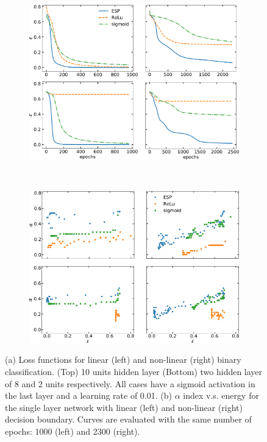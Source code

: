 \documentclass[5p]{elsarticle}
\begin{document}
\begin{figure}[t!]
\centering
	\begin{subfigure}[b]{0.48 \textwidth}
	\includegraphics[width = \textwidth]{costs.pdf}
	\end{subfigure}
 	~
	\begin{subfigure}[b]{0.48 \textwidth}
 		\includegraphics[width = \textwidth]{alpha.pdf}
	\end{subfigure}
	\caption{ \label{fig:index} (a) Loss functions for linear (left) and non-linear (right) binary classification. (Top) 10 units hidden layer (Bottom) two hidden layer of 8 and 2 units respectively. All cases have a sigmoid activation in the last layer and a learning rate of 0.01. (b) $\alpha$ index  v.s. energy for the single layer network with linear (left) and non-linear (right) decision boundary. Curves are evaluated with the same number of epochs: 1000 (left) and 2300 (right). }
\end{figure}
\end{document}
